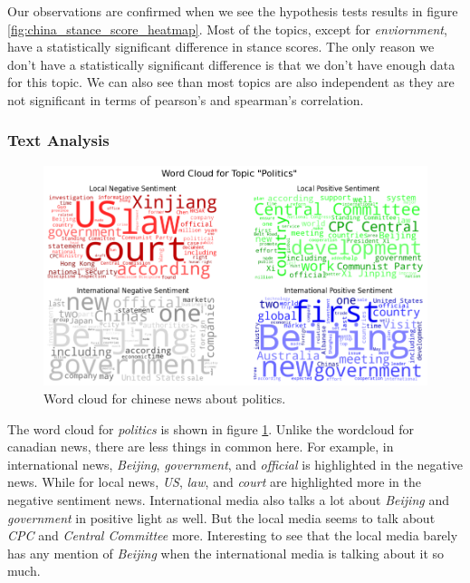 \documentclass{article}
\theoremstyle{mytheoremstyle}
\theoremstyle{mytheoremstyle}
\theoremstyle{myproblemstyle}
\begin{document}
    Our observations are confirmed when we see the hypothesis tests results in figure \ref{fig:china_stance_score_heatmap}. Most of the topics, except for \emph{enviornment}, have a statistically significant difference in stance scores. The only reason we don't have a statistically significant difference is that we don't have enough data for this topic. We can also see than most topics are also independent as they are not significant in terms of pearson's and spearman's correlation.

    \subsubsection{Text Analysis}

    \begin{figure}[hp]
        \centering
        \includegraphics[width=\linewidth]{../images/plots/China/china_wordcloud_politics.png}
        \caption{Word cloud for chinese news about politics.}
        \label{fig:chinese_sentiment_score_wordcloud}
    \end{figure}

    The word cloud for \emph{politics} is shown in figure \ref{fig:chinese_sentiment_score_wordcloud}. Unlike the wordcloud for canadian news, there are less things in common here. For example, in international news, \emph{Beijing}, \emph{government}, and \emph{official} is highlighted in the negative news. While for local news, \emph{US}, \emph{law}, and \emph{court} are highlighted more in the negative sentiment news. International media also talks a lot about \emph{Beijing} and \emph{government} in positive light as well. But the local media seems to talk about \emph{CPC} and \emph{Central Committee} more. Interesting to see that the local media barely has any mention of \emph{Beijing} when the international media is talking about it so much.
\end{document}
